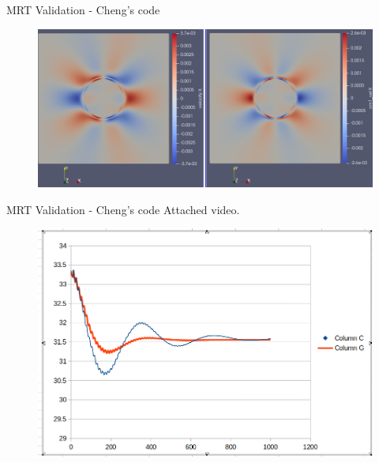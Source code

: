 \documentclass{beamer}
\begin{document}
	
	\begin{frame}{MRT Validation - Cheng's code}
		\begin{figure}
			\centering
			\includegraphics[scale=0.25]{pics/MRT_StaticDroplet_VelField.png}
		\end{figure}
	\end{frame}
	\begin{frame}{MRT Validation - Cheng's code}
		Attached video.
		\begin{figure}
			\centering
			\includegraphics[scale=0.25]{pics/MRT_oscillatingAxis.png}
		\end{figure}
	\end{frame}
	
\end{document}
